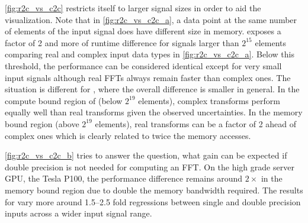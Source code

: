 \cref{fig:r2c_vs_c2c} restricts itself to larger signal sizes in order to aid the visualization. Note that in \cref{fig:r2c_vs_c2c_a}, a data point at the same number of elements of the input signal does have different size in memory. \fftw{} exposes a factor of 2 and more of runtime difference for signals larger than $2^{15}$ elements comparing real and complex input data types in \cref{fig:r2c_vs_c2c_a}. Below this threshold, the performance can be considered identical except for very small input signals although real FFTs always remain faster than complex ones. The situation is different for \cufft{}, where the overall difference is smaller in general. In the compute bound region of \cufft{} (below $2^{19}$ elements), complex transforms perform equally well than real transforms given the observed uncertainties. In the memory bound region (above $2^{19}$ elements), real transforms can be a factor of 2 ahead of complex ones which is clearly related to twice the memory accesses.    

 \cref{fig:r2c_vs_c2c_b} tries to answer the question, what gain can be expected if double precision is not needed for computing an FFT. On the high grade server GPU, the \nvidia{} Tesla P100, the performance difference remains around $2{\times}$ in the memory bound region due to double the memory bandwidth required. The results for \fftw{} vary more around \numrange{1.5}{2.5} fold regressions between single and double precision inputs across a wider input signal range. 

